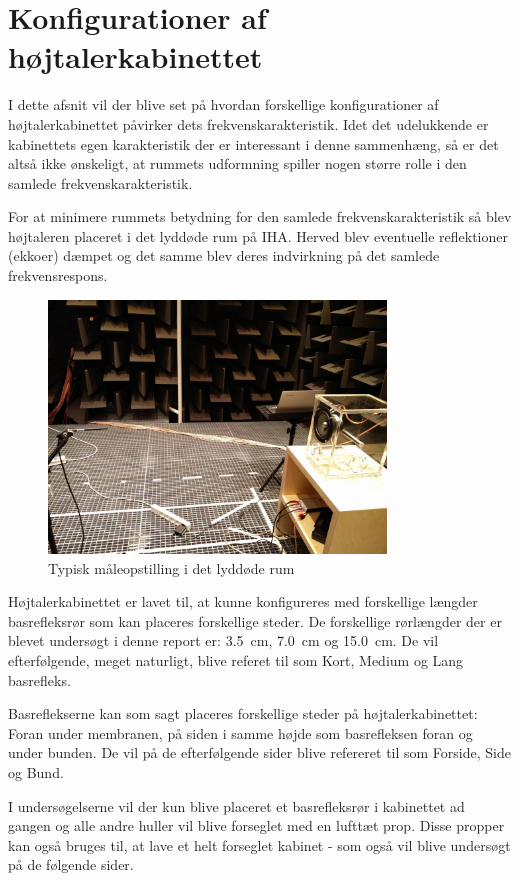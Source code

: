 \section{Konfigurationer af højtalerkabinettet}
I dette afsnit vil der blive set på hvordan forskellige konfigurationer af højtalerkabinettet påvirker dets frekvenskarakteristik. Idet det udelukkende er kabinettets egen karakteristik der er interessant i denne sammenhæng, så er det altså ikke ønskeligt, at rummets udformning spiller nogen større rolle i den samlede frekvenskarakteristik.

For at minimere rummets betydning for den samlede frekvenskarakteristik så blev højtaleren placeret i det lyddøde rum på IHA. Herved blev eventuelle reflektioner (ekkoer) dæmpet og det samme blev deres indvirkning på det samlede frekvensrespons.
\begin{figure}[H]
	\centering
	\includegraphics[width=0.8\textwidth]{Billeder/LyddodtRum}
	\caption{Typisk måleopstilling i det lyddøde rum}
\end{figure}

Højtalerkabinettet er lavet til, at kunne konfigureres med forskellige længder basrefleksrør som kan placeres forskellige steder. De forskellige rørlængder der er blevet undersøgt i denne report er: \SI{3,5}{\centi\meter}, \SI{7,0}{\centi\meter} og \SI{15,0}{\centi\meter}. De vil efterfølgende, meget naturligt, blive referet til som Kort, Medium og Lang basrefleks.

Basreflekserne kan som sagt placeres forskellige steder på højtalerkabinettet: Foran under membranen, på siden i samme højde som basrefleksen foran og under bunden. De vil på de efterfølgende sider blive refereret til som Forside, Side og Bund.

I undersøgelserne vil der kun blive placeret et basrefleksrør i kabinettet ad gangen og alle andre huller vil blive forseglet med en lufttæt prop. Disse propper kan også bruges til, at lave et helt forseglet kabinet - som også vil blive undersøgt på de følgende sider.

